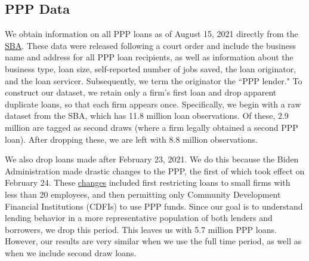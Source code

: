 \documentclass[11pt]{article}
\begin{document}
\subsection{PPP Data}\label{ppp_data}

We obtain information on all PPP loans as of August 15, 2021 directly from the \href{https://data.sba.gov/dataset/ppp-foia}{SBA}. These data were released following a court order and include the business name and address for all PPP loan recipients, as well as information about the business type, loan size, self-reported number of jobs saved, the loan originator, and the loan servicer. Subsequently, we term the originator the ``PPP lender." To construct our dataset, we retain only a firm's first loan and drop apparent duplicate loans, so that each firm appears once. Specifically, we begin with a raw dataset from the SBA, which has 11.8 million loan observations. Of these, 2.9 million are tagged as second draws (where a firm legally obtained a second PPP loan). After dropping these, we are left with 8.8 million observations. 

We also drop loans made after February 23, 2021. We do this because the Biden Administration made drastic changes to the PPP, the first of which took effect on February 24. These \href{https://www.jdsupra.com/legalnews/paycheck-protection-program-round-2-7761547/}{changes} included first restricting loans to small firms with less than 20 employees, and then permitting only Community Development Financial Institutions (CDFIs) to use PPP funds. Since our goal is to understand lending behavior in a more representative population of both lenders and borrowers, we drop this period. This leaves us with 5.7 million PPP loans. However, our results are very similar when we use the full time period, as well as when we include second draw loans. 
\end{document}
